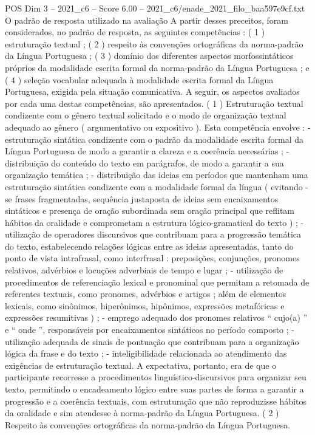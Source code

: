 \begin{textsample}{POS Dim 3 – 2021\_c6 – Score 6.00 – 2021\_c6/enade\_2021\_filo\_baa597e9cf.txt}
O padrão de resposta utilizado na avaliação A partir desses preceitos, foram considerados, no padrão de resposta, as seguintes competências : ( 1 ) estruturação textual ; ( 2 ) respeito às convenções ortográficas da norma-padrão da Língua Portuguesa ; ( 3 ) domínio dos diferentes aspectos morfossintáticos próprios da modalidade escrita formal da norma-padrão da Língua Portuguesa ; e ( 4 ) seleção vocabular adequada à modalidade escrita formal da Língua Portuguesa, exigida pela situação comunicativa.
A seguir, os aspectos avaliados por cada uma destas competências, são apresentados. ( 1 ) Estruturação textual condizente com o gênero textual solicitado e o modo de organização textual adequado ao gênero ( argumentativo ou expositivo ).
Esta competência envolve : - estruturação sintática condizente com o padrão da modalidade escrita formal da Língua Portuguesa de modo a garantir a clareza e a coerência necessárias ; - distribuição do conteúdo do texto em parágrafos, de modo a garantir a sua organização temática ; - distribuição das ideias em períodos que mantenham uma estruturação sintática condizente com a modalidade formal da língua ( evitando -se frases fragmentadas, sequência justaposta de ideias sem encaixamentos sintáticos e presença de oração subordinada sem oração principal que reflitam hábitos da oralidade e comprometam a estrutura lógico-gramatical do texto ) ; - utilização de operadores discursivos que contribuam para a progressão temática do texto, estabelecendo relações lógicas entre as ideias apresentadas, tanto do ponto de vista intrafrasal, como interfrasal : preposições, conjunções, pronomes relativos, advérbios e locuções adverbiais de tempo e lugar ; - utilização de procedimentos de referenciação lexical e pronominal que permitam a retomada de referentes textuais, como pronomes, advérbios e artigos ; além de elementos lexicais, como sinônimos, hiperônimos, hipônimos, expressões metafóricas e expressões resumitivas ) ; - emprego adequado dos pronomes relativos “ cujo(a) ” e “ onde ”, responsáveis por encaixamentos sintáticos no período composto ; - utilização adequada de sinais de pontuação que contribuam para a organização lógica da frase e do texto ; - inteligibilidade relacionada ao atendimento das exigências de estruturação textual.
A expectativa, portanto, era de que o participante recorresse a procedimentos linguístico-discursivos para organizar seu texto, permitindo o encadeamento lógico entre suas partes de forma a garantir a progressão e a coerência textuais, com estruturação que não reproduzisse hábitos da oralidade e sim atendesse à norma-padrão da Língua Portuguesa. ( 2 ) Respeito às convenções ortográficas da norma-padrão da Língua Portuguesa.

\end{textsample}
